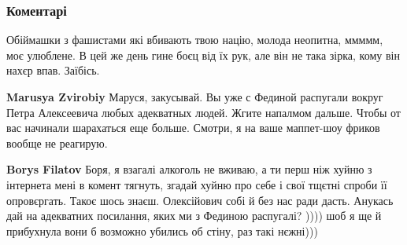  
 
 
 
 
\subsubsection{Коментарі}

\begin{itemize}


Обіймашки з фашистами які вбивають твою націю, молода неопитна, ммммм, моє
улюблене. В цей же день гине боєц від їх рук, але він не така зірка, кому він
нахєр впав. Заїбісь.

\begin{itemize}

 
\textbf{Marusya Zvirobiy} Маруся, закусывай.
Вы уже с Фединой распугали вокруг Петра Алексеевича любых адекватных людей.
Жгите напалмом дальше.
Чтобы от вас начинали шарахаться еще больше.
Смотри, я на ваше маппет-шоу фриков вообще не реагирую.

 

\textbf{Borys Filatov} Боря, я взагалі алкоголь не вживаю, а ти перш ніж хуйню з інтернета мені в комент тягнуть, згадай хуйню про себе і свої тщєтні спроби її опровєргать. Такоє шось знаєш. Олексійович собі й без нас ради дасть. Анукась дай на адекватних посилання, яких ми з Фединою распугалі? )))) шоб я ще й прибухнула вони б возможно убились об стіну, раз такі нєжні)))


 

\end{itemize}
\end{itemize}
